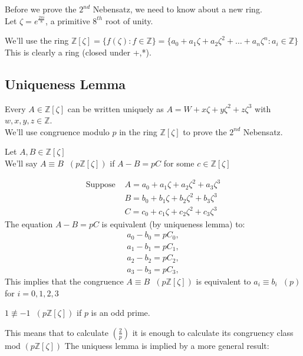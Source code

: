 \documentclass[11pt]{article}
\begin{document}
Before we prove the $2^{nd}$ Nebensatz, we need to know about a new ring.\\[0.5em]
Let $\zeta= e^{\frac{2\pi i}{8}}$, a primitive $8^{th}$ root of unity.

We'll use the ring $\mathbb{Z}[\zeta] = \{f(\zeta) \colon f \in \mathbb{Z} \} = \{a_0 + a_1\zeta +a_2 \zeta^2 +\dots + a_n\zeta^n : a_i \in \mathbb{Z} \}$\\
This is clearly a ring (closed under +,*).

\subsection{Uniqueness Lemma}

Every $A \in \mathbb{Z}[\zeta]$ can be written uniquely as $A = W + x\zeta + y\zeta^2 +z\zeta^3$ with $w,x,y,z \in \mathbb{Z}$.\\
We'll use congruence modulo $p$ in the ring $\mathbb{Z}[\zeta]$ to prove the $2^{nd}$ Nebensatz.

\begin{definition}
	Let $A,B \in \mathbb{Z}[\zeta]$\\
	We'll say $A \equiv B \hspace{7pt} (p\mathbb{Z}[\zeta])$ if $A-B = pC$ for some $c \in \mathbb{Z}[\zeta]$
\end{definition}
\begin{align*}
	\text{Suppose } & A = a_0 + a_1\zeta + a_2\zeta^2 +a_3\zeta^3\\
	& B = b_0 + b_1\zeta + b_2\zeta^2 +b_3\zeta^3\\
	& C = c_0 + c_1\zeta + c_2\zeta^2 +c_3\zeta^3
\end{align*}
The equation $A-B = pC$ is equivalent (by uniqueness lemma) to:
\begin{align*}
a_0 -b_0 =pC_0, \\
	a_1 -b_1 =pC_1,\\
	a_2 -b_2 =pC_2, \\
	a_3 -b_3 =pC_3,  
\end{align*}
This implies that the congruence $A \equiv B \hspace{7pt} (p\mathbb{Z}[\zeta])$ is equivalent to $a_i \equiv b_i \hspace{7pt} (p)$ for $i=0,1,2,3$

\begin{corollary}
	$1\not \equiv -1 \hspace{7pt}(p\mathbb{Z}[\zeta])$ if $p$ is an odd prime. 
\end{corollary}
This means that to calculate $(\frac{2}{p})$ it is enough to calculate its congruency class mod $(p\mathbb{Z}[\zeta])$
The uniquess lemma is implied by a more general result:
\end{document}

